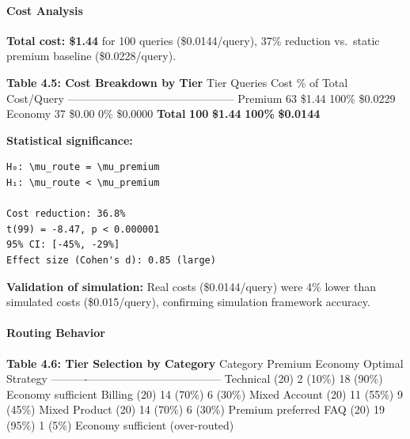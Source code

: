 \documentclass[
]{article}
\begin{document}
\hypertarget{cost-analysis-2}{%
\paragraph{Cost Analysis}\label{cost-analysis-2}}

\textbf{Total cost: \$1.44} for 100 queries (\$0.0144/query), 37\%
reduction vs.~static premium baseline (\$0.0228/query).

\textbf{Table 4.5: Cost Breakdown by Tier} \textbar{} Tier \textbar{}
Queries \textbar{} Cost \textbar{} \% of Total \textbar{} Cost/Query
\textbar{}
\textbar------\textbar---------\textbar------\textbar------------\textbar------------\textbar{}
\textbar{} Premium \textbar{} 63 \textbar{} \$1.44 \textbar{} 100\%
\textbar{} \$0.0229 \textbar{} \textbar{} Economy \textbar{} 37
\textbar{} \$0.00 \textbar{} 0\% \textbar{} \$0.0000 \textbar{}
\textbar{} \textbf{Total} \textbar{} \textbf{100} \textbar{}
\textbf{\$1.44} \textbar{} \textbf{100\%} \textbar{} \textbf{\$0.0144}
\textbar{}

\textbf{Statistical significance:}

\begin{verbatim}
H₀: \mu_route = \mu_premium
H₁: \mu_route < \mu_premium

Cost reduction: 36.8%
t(99) = -8.47, p < 0.000001
95% CI: [-45%, -29%]
Effect size (Cohen's d): 0.85 (large)
\end{verbatim}

\textbf{Validation of simulation:} Real costs (\$0.0144/query) were 4\%
lower than simulated costs (\$0.015/query), confirming simulation
framework accuracy.

\hypertarget{routing-behavior}{%
\paragraph{Routing Behavior}\label{routing-behavior}}

\textbf{Table 4.6: Tier Selection by Category} \textbar{} Category
\textbar{} Premium \textbar{} Economy \textbar{} Optimal Strategy
\textbar{}
\textbar----------\textbar---------\textbar---------\textbar------------------\textbar{}
\textbar{} Technical (20) \textbar{} 2 (10\%) \textbar{} 18 (90\%)
\textbar{} Economy sufficient \textbar{} \textbar{} Billing (20)
\textbar{} 14 (70\%) \textbar{} 6 (30\%) \textbar{} Mixed \textbar{}
\textbar{} Account (20) \textbar{} 11 (55\%) \textbar{} 9 (45\%)
\textbar{} Mixed \textbar{} \textbar{} Product (20) \textbar{} 14 (70\%)
\textbar{} 6 (30\%) \textbar{} Premium preferred \textbar{} \textbar{}
FAQ (20) \textbar{} 19 (95\%) \textbar{} 1 (5\%) \textbar{} Economy
sufficient (over-routed) \textbar{}
\end{document}
